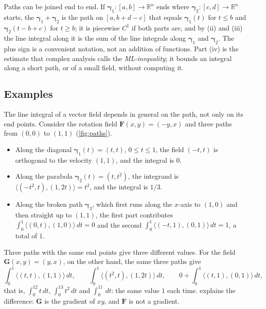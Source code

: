 Paths can be joined end to end. If $\boldsymbol\gamma_1\colon[a,b]\to\mathbb R^n$ ends where $\boldsymbol\gamma_2\colon[c,d]\to\mathbb R^n$ starts, the  $\boldsymbol\gamma_1+\boldsymbol\gamma_2$ is the path on $[a,b+d-c]$ that equals $\boldsymbol\gamma_1(t)$ for $t\le b$ and $\boldsymbol\gamma_2(t-b+c)$ for $t\ge b$; it is piecewise $C^1$ if both parts are, and by (ii) and (iii) the line integral along it is the sum of the line integrals along $\boldsymbol\gamma_1$ and $\boldsymbol\gamma_2$. The plus sign is a convenient notation, not an addition of functions. Part (iv) is the estimate that complex analysis calls the \emph{ML-inequality}; it bounds an integral along a short path, or of a small field, without computing it.

\subsection{Examples}

The line integral of a vector field depends in general on the path, not only on its end points. Consider the rotation field $\mathbf F(x,y)=(-y,x)$ and three paths from $(0,0)$ to $(1,1)$ (\cref{fig:paths}).
\begin{itemize}
\item Along the diagonal $\boldsymbol\gamma_1(t)=(t,t)$, $0\le t\le1$, the field $(-t,t)$ is orthogonal to the velocity $(1,1)$, and the integral is $0$.
\item Along the parabola $\boldsymbol\gamma_2(t)=(t,t^2)$, the integrand is $\langle(-t^2,t),(1,2t)\rangle=t^2$, and the integral is $1/3$.
\item Along the broken path $\boldsymbol\gamma_3$, which first runs along the $x$-axis to $(1,0)$ and then straight up to $(1,1)$, the first part contributes $\int_0^1\langle(0,t),(1,0)\rangle\,dt=0$ and the second $\int_0^1\langle(-t,1),(0,1)\rangle\,dt=1$, a total of $1$.
\end{itemize}
Three paths with the same end points give three different values. For the field $\mathbf G(x,y)=(y,x)$, on the other hand, the same three paths give
\[
\int_0^1\bigl\langle(t,t),(1,1)\bigr\rangle\,dt,\qquad\int_0^1\bigl\langle(t^2,t),(1,2t)\bigr\rangle\,dt,\qquad0+\int_0^1\bigl\langle(t,1),(0,1)\bigr\rangle\,dt ,
\]
that is, $\int_0^12t\,dt$, $\int_0^13t^2\,dt$ and $\int_0^11\,dt$: the same value $1$ each time.  explains the difference: $\mathbf G$ is the gradient of $xy$, and $\mathbf F$ is not a gradient.

